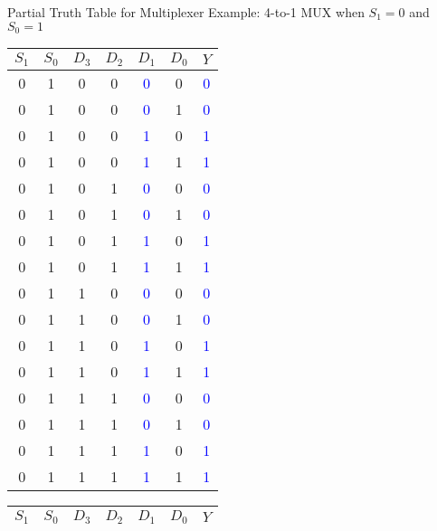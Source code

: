 \begin{frame}{Partial Truth Table for Multiplexer}
Example: 4-to-1 MUX when $S_1 = 0$ and $S_0 = 1$
\begin{multicols}{2}
  \begin{center}
\small
		\begin{tabular}{cc|cccc|c}
		 $S_1$ & $S_0$ & $D_3$ & $D_2$ &$D_1$ & $D_0$ & $Y$\\\hline
   0 & 1 & 0 & 0 & \textcolor{blue}{0} & 0 & \textcolor{blue}{0} \\
   0 & 1 & 0 & 0 & \textcolor{blue}{0} & 1 &\textcolor{blue}{0} \\
   0 & 1 & 0 & 0 & \textcolor{blue}{1} & 0 & \textcolor{blue}{1} \\
   0 & 1 & 0 & 0 & \textcolor{blue}{1} & 1 &\textcolor{blue}{1} \\
   0 & 1 & 0 & 1 &  \textcolor{blue}{0} & 0 & \textcolor{blue}{0} \\
    0 & 1 & 0 & 1 &  \textcolor{blue}{0} & 1& \textcolor{blue}{0} \\
    0 &1 & 0 & 1 &  \textcolor{blue}{1} & 0 & \textcolor{blue}{1} \\
    0 & 1 & 0 & 1 &  \textcolor{blue}{1} & 1& \textcolor{blue}{1} \\
   \hline
  0 & 1 & 1 & 0 & \textcolor{blue}{0} & 0 & \textcolor{blue}{0} \\
   0 & 1 & 1 & 0 & \textcolor{blue}{0} & 1 &\textcolor{blue}{0} \\
   0 & 1 & 1 & 0 & \textcolor{blue}{1} & 0 & \textcolor{blue}{1} \\
   0 & 1 & 1 & 0 & \textcolor{blue}{1} & 1 &\textcolor{blue}{1} \\
   0 & 1 & 1 & 1 &  \textcolor{blue}{0} & 0 & \textcolor{blue}{0} \\
    0 & 1 &1 & 1 &  \textcolor{blue}{0} & 1& \textcolor{blue}{0} \\
    0 &1 & 1 & 1 &  \textcolor{blue}{1} & 0 & \textcolor{blue}{1} \\
    0 & 1 & 1 & 1 &  \textcolor{blue}{1} & 1& \textcolor{blue}{1} \\
    \hline
		\end{tabular}
		\end{center}

  \columnbreak

 \begin{center}
\small
		\begin{tabular}{cc|cccc|c}
		 $S_1$ & $S_0$ & $D_3$ & $D_2$ &$D_1$ & $D_0$ & $Y$\\\hline
		

\end{tabular}
\end{center}
\end{multicols}
\end{frame}
